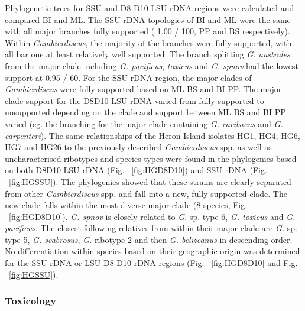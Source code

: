 \documentclass[12pt]{article}
\begin{document}
Phylogenetic trees for SSU and D8-D10 LSU rDNA regions were calculated and compared BI and ML. The SSU rDNA  topologies of BI and ML were the same with all major branches fully supported ( 1.00 / 100, PP and BS respectively). Within \emph{Gambierdiscus}, the majority of the branches were fully supported, with all bar one at least relatively well supported. The branch splitting \emph{G. australes} from the major clade including \emph{G. pacificus}, \emph{toxicus} and \emph{G. spnov} had the lowest support at 0.95 / 60.
For the SSU rDNA region, the major clades of \textit{Gambierdiscus }were fully supported based on ML BS and BI PP. The major clade support for the D8D10 LSU rDNA varied from fully supported to unsupported depending on the clade and support between ML BS and BI PP varied (eg. the branching for the major clade containing \emph{G. caribaeus} and \emph{G. carpenteri}). The same relationships of the Heron Island isolates HG1, HG4, HG6, HG7 and HG26 to the previously described \emph{Gambierdiscus} spp. as well as uncharacterised ribotypes and species types were found in the phylogenies based on both D8D10 LSU rDNA (Fig. ~\ref{fig:HGD8D10}) and SSU rDNA (Fig. ~\ref{fig:HGSSU}). The phylogenies showed that these strains are clearly separated from other \emph{Gambierdiscus} spp. and fall into a new, fully supported clade. The new clade falls within the most diverse major clade (8 species, Fig. ~\ref{fig:HGD8D10}). \emph{G. spnov} is closely related to \emph{G.} sp. type 6, \emph{G. toxicus} and \emph{G. pacificus}. The closest following relatives from within their major clade are \emph{G.} sp. type 5, \emph{G. scabrosus}, \emph{G.} ribotype 2 and then \emph{G. belizeanus} in descending order. \\
No differentiation within species based on their geographic origin was determined for the SSU rDNA or LSU D8-D10 rDNA regions (Fig. ~\ref{fig:HGD8D10} and Fig. ~\ref{fig:HGSSU}).


\subsubsection{Toxicology}
\end{document}
